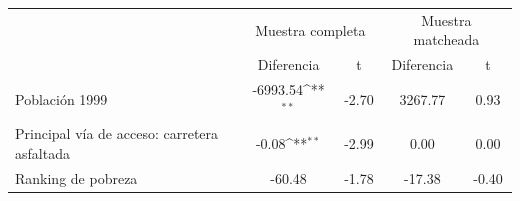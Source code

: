 {
\def\sym#1{\ifmmode^{#1}\else\(^{#1}\)\fi}
\begin{tabular}{l*{2}{cc}}
\toprule
                    &\multicolumn{2}{c}{Muestra completa}&\multicolumn{2}{c}{Muestra matcheada}\\
                    &  Diferencia         &           t&  Diferencia         &           t\\
\midrule
Población 1999      &    -6993.54\sym{**} &       -2.70&     3267.77         &        0.93\\
Principal vía de acceso: carretera asfaltada&       -0.08\sym{**} &       -2.99&        0.00         &        0.00\\
Ranking de pobreza  &      -60.48         &       -1.78&      -17.38         &       -0.40\\
\bottomrule
\end{tabular}
}
